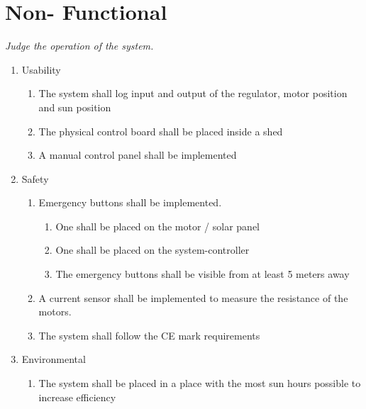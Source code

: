 \documentclass[12pt,a4paper]{report}
\begin{document}
\section{Non- Functional}
\textit{Judge the operation of the system. }
\begin{enumerate}
\item	Usability
\begin{enumerate}
	\item	The system shall log input and output of the regulator, motor position and sun position
	\item 	The physical control board shall be placed inside a shed
	\item	A manual control panel shall be implemented
\end{enumerate}
\item	Safety
\begin{enumerate}
	\item	Emergency buttons shall be implemented.
	\begin{enumerate}
		\item	One shall be placed on the motor / solar panel
		\item	One shall be placed on the system-controller
		\item	The emergency buttons shall be visible from at least 5 meters away
	\end{enumerate}
	\item	A current sensor shall be implemented to measure the resistance of the motors.
	\item	The system shall follow the CE mark requirements
\end{enumerate}
\item	Environmental
\begin{enumerate}
	\item	The system shall be placed in a place with the most sun hours possible to increase efficiency
\end{enumerate}


\end{enumerate}
\end{document}
